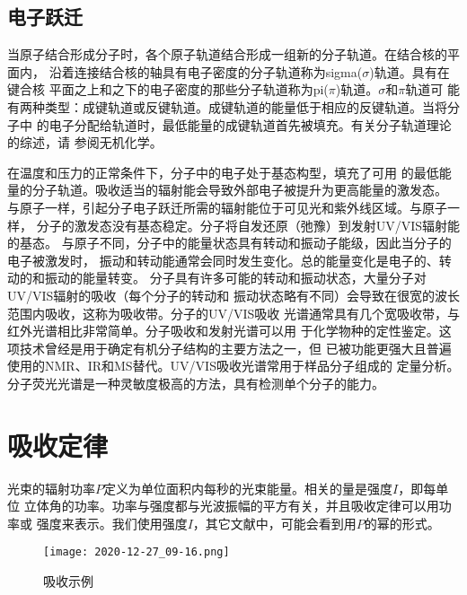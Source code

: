 \subsection{电子跃迁}
当原子结合形成分子时，各个原子轨道结合形成一组新的分子轨道。在结合核的平面内，
沿着连接结合核的轴具有电子密度的分子轨道称为sigma($\sigma$)轨道。具有在键合核
平面之上和之下的电子密度的那些分子轨道称为pi($\pi$)轨道。$\sigma$和$\pi$轨道可
能有两种类型：成键轨道或反键轨道。成键轨道的能量低于相应的反键轨道。当将分子中
的电子分配给轨道时，最低能量的成键轨道首先被填充。有关分子轨道理论的综述，请
参阅无机化学。

在温度和压力的正常条件下，分子中的电子处于基态构型，填充了可用
的最低能量的分子轨道。吸收适当的辐射能会导致外部电子被提升为更高能量的激发态。
与原子一样，引起分子电子跃迁所需的辐射能位于可见光和紫外线区域。与原子一样，
分子的激发态没有基态稳定。分子将自发还原（弛豫）到发射UV/VIS辐射能的基态。
与原子不同，分子中的能量状态具有转动和振动子能级，因此当分子的电子被激发时，
振动和转动能通常会同时发生变化。总的能量变化是电子的、转动的和振动的能量转变。
分子具有许多可能的转动和振动状态，大量分子对UV/VIS辐射的吸收（每个分子的转动和
振动状态略有不同）会导致在很宽的波长范围内吸收，这称为吸收带。分子的UV/VIS吸收
光谱通常具有几个宽吸收带，与红外光谱相比非常简单。分子吸收和发射光谱可以用
于化学物种的定性鉴定。这项技术曾经是用于确定有机分子结构的主要方法之一，但
已被功能更强大且普遍使用的NMR、IR和MS替代。UV/VIS吸收光谱常用于样品分子组成的
定量分析。分子荧光光谱是一种灵敏度极高的方法，具有检测单个分子的能力。
\section{吸收定律}
光束的辐射功率$P$定义为单位面积内每秒的光束能量。相关的量是强度$I$，即每单位
立体角的功率。功率与强度都与光波振幅的平方有关，并且吸收定律可以用功率或
强度来表示。我们使用强度$I$，其它文献中，可能会看到用$P$的幂的形式。

\begin{figure}[htpb]
    \centering
    \texttt{[image: 2020-12-27\_09-16.png]}
    \caption{吸收示例}
    \label{fig:2.8}
\end{figure}

